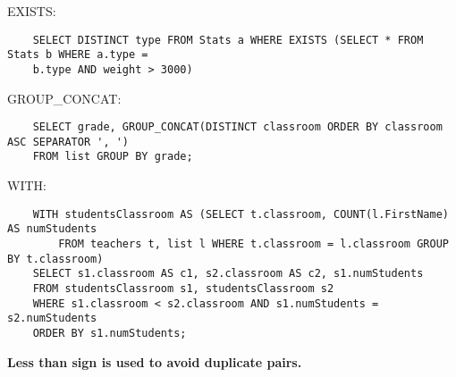 \documentclass[9pt]{extarticle}
\begin{document}
EXISTS:
\begin{verbatim}
    SELECT DISTINCT type FROM Stats a WHERE EXISTS (SELECT * FROM Stats b WHERE a.type = 
    b.type AND weight > 3000)
\end{verbatim}

GROUP\_CONCAT:
\begin{verbatim}
    SELECT grade, GROUP_CONCAT(DISTINCT classroom ORDER BY classroom ASC SEPARATOR ', ') 
    FROM list GROUP BY grade;
\end{verbatim}

WITH:
\begin{verbatim}
    WITH studentsClassroom AS (SELECT t.classroom, COUNT(l.FirstName) AS numStudents 
        FROM teachers t, list l WHERE t.classroom = l.classroom GROUP BY t.classroom)
    SELECT s1.classroom AS c1, s2.classroom AS c2, s1.numStudents
    FROM studentsClassroom s1, studentsClassroom s2
    WHERE s1.classroom < s2.classroom AND s1.numStudents = s2.numStudents
    ORDER BY s1.numStudents;
\end{verbatim}
\textbf{Less than sign is used to avoid duplicate pairs.}
\end{document}

